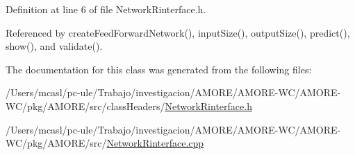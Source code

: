 Definition at line 6 of file NetworkRinterface.h.



Referenced by createFeedForwardNetwork(), inputSize(), outputSize(), predict(), show(), and validate().



The documentation for this class was generated from the following files:\begin{DoxyCompactItemize}
\item 
/Users/mcasl/pc-\/ule/Trabajo/investigacion/AMORE/AMORE-\/WC/AMORE-\/WC/pkg/AMORE/src/classHeaders/\hyperlink{_network_rinterface_8h}{NetworkRinterface.h}\item 
/Users/mcasl/pc-\/ule/Trabajo/investigacion/AMORE/AMORE-\/WC/AMORE-\/WC/pkg/AMORE/src/\hyperlink{_network_rinterface_8cpp}{NetworkRinterface.cpp}\end{DoxyCompactItemize}
